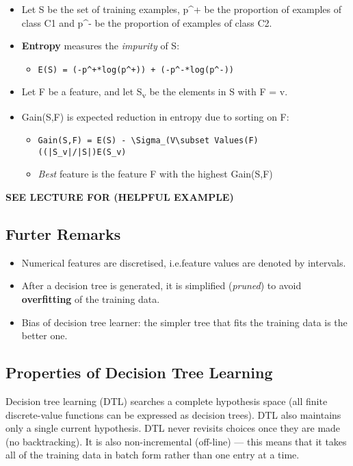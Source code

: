 \documentclass[11pt]{article}
\begin{document}
\begin{itemize}
\item Let S be the set of training examples, p\^{}+ be the proportion of examples of class C1 and p\^{}- be the proportion of examples of class C2.
\item \textbf{Entropy} measures the \emph{impurity} of S:
\begin{itemize}
\item \texttt{E(S) = (-p\textasciicircum{}+*log(p\textasciicircum{}+)) + (-p\textasciicircum{}-*log(p\textasciicircum{}-))}
\end{itemize}
\item Let F be a feature, and let S\textsubscript{v} be the elements in S with F = v.
\item Gain(S,F) is expected reduction in entropy due to sorting on F:
\begin{itemize}
\item \texttt{Gain(S,F) = E(S) - \textbackslash{}Sigma\_(V\textbackslash{}subset Values(F) ((|S\_v|/|S|)E(S\_v)}
\item \emph{Best} feature is the feature F with the highest Gain(S,F)
\end{itemize}
\end{itemize}

\textbf{SEE LECTURE FOR (HELPFUL EXAMPLE)}

\subsection{Furter Remarks}
\label{sec:orgcf37b85}
\begin{itemize}
\item Numerical features are discretised, i.e.feature values are denoted by intervals.
\item After a decision tree is generated, it is simplified (\emph{pruned}) to avoid \textbf{overfitting} of the training data.
\item Bias of decision tree learner: the simpler tree that fits the training data is the better one.
\end{itemize}

\subsection{Properties of Decision Tree Learning}
\label{sec:org2610208}
Decision tree learning (DTL) searches a complete hypothesis space (all finite discrete-value functions can be expressed as decision trees).
DTL also maintains only a single current hypothesis.
DTL never revisits choices once they are made (no backtracking).
It is also non-incremental (off-line) --- this means that it takes all of the training data in batch form rather than one entry at a time.
\end{document}
